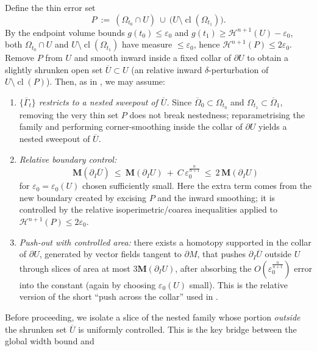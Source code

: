 Define the thin error set
\begin{equation*}
  P \ :=\ (\Omega_{t_0}\cap U)\ \cup\ \bigl(U\setminus \operatorname{cl}(\Omega_{t_1})).
\end{equation*}
By the endpoint volume bounds $g(t_0)\le \varepsilon_0$ and $g(t_1)\ge \mathcal{H}^{n+1}(U)-\varepsilon_0$, both
$\Omega_{t_0}\cap U$ and $U\setminus \operatorname{cl}(\Omega_{t_1})$ have measure $\le \varepsilon_0$, hence
$\mathcal{H}^{n+1}(P)\le 2\varepsilon_0$. Remove $P$ from $U$ and smooth inward inside a fixed collar of $\partial U$
to obtain a slightly shrunken open set $\overline U\subset U$ (an relative inward $\delta$-perturbation of $U\setminus \operatorname{cl}(P)$).
Then, as in \cite[p.~26]{CL20}, we may assume:
\begin{enumerate}
  \item[(i)] \emph{$\{\overline{\Gamma}_t\}$ restricts to a nested sweepout of $\overline U$.}
  Since $\overline\Omega_0\subset \Omega_{t_0}$ and $\Omega_{t_1}\subset \overline\Omega_1$, removing the very thin
  set $P$ does not break nestedness; reparametrising the family and performing corner-smoothing inside the collar of
  $\partial U$ yields a nested sweepout of $\overline U$.
  \item[(ii)] \emph{Relative boundary control:}
  \begin{equation*}
    \mathbf{M}(\partial_I\overline U)
    \ \le\ \mathbf{M}(\partial_IU)\ +\ C\,\varepsilon_0^{\frac{n}{n+1}}
    \ \le\ 2\,\mathbf{M}(\partial_IU)
  \end{equation*}
  for $\varepsilon_0=\varepsilon_0(U)$ chosen sufficiently small. Here the extra term comes from the new boundary
  created by excising $P$ and the inward smoothing; it is controlled by the relative isoperimetric/coarea
  inequalities applied to $\mathcal{H}^{n+1}(P)\le 2\varepsilon_0$.
  \item[(iii)] \emph{Push-out with controlled area:}
  there exists a homotopy supported in the collar of $\partial U$, generated by vector fields tangent to $\partial M$,
  that pushes $\partial_I\overline U$ outside $U$ through slices of area at most $3\mathbf{M}(\partial_IU)$, after absorbing the $O(\varepsilon_0^{\frac{n}{n+1}})$ error into the constant (again by choosing
  $\varepsilon_0(U)$ small). This is the relative version of the short “push across the collar” used in \cite{CL20}.
\end{enumerate}
Before proceeding, we isolate a slice of the nested family whose portion \emph{outside} the shrunken
set $\overline U$ is uniformly controlled. This is the key bridge between the global width bound and
